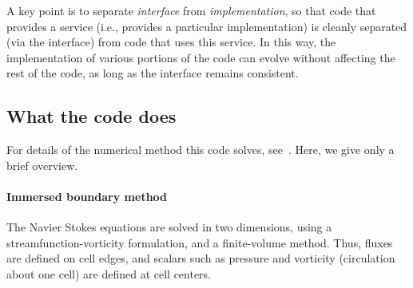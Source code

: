 \documentclass[11pt]{article}
\begin{document}
A key point is to separate {\em interface} from {\em implementation}, so that code that provides a service (i.e., provides a particular implementation) is cleanly separated (via the interface) from code that uses this service.  In this way, the implementation of various portions of the code can evolve without affecting the rest of the code, as long as the interface remains consistent.

\subsection{What the code does}
For details of the numerical method this code solves, see~\cite{ColTai-07}.  Here, we give only a brief overview.

\paragraph{Immersed boundary method}
The Navier Stokes equations are solved in two dimensions, using a streamfunction-vorticity formulation, and a finite-volume method.  Thus, fluxes are defined on cell edges, and scalars such as pressure and vorticity (circulation about one cell) are defined at cell centers.
\end{document}
